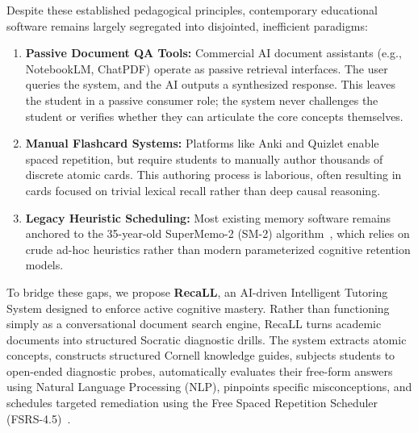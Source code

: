 \documentclass[conference]{IEEEtran}
\begin{document}
Despite these established pedagogical principles, contemporary educational software remains largely segregated into disjointed, inefficient paradigms:
\begin{enumerate}
    \item \textbf{Passive Document QA Tools:} Commercial AI document assistants (e.g., NotebookLM, ChatPDF) operate as passive retrieval interfaces. The user queries the system, and the AI outputs a synthesized response. This leaves the student in a passive consumer role; the system never challenges the student or verifies whether they can articulate the core concepts themselves.
    \item \textbf{Manual Flashcard Systems:} Platforms like Anki and Quizlet enable spaced repetition, but require students to manually author thousands of discrete atomic cards. This authoring process is laborious, often resulting in cards focused on trivial lexical recall rather than deep causal reasoning.
    \item \textbf{Legacy Heuristic Scheduling:} Most existing memory software remains anchored to the 35-year-old SuperMemo-2 (SM-2) algorithm~\cite{wozniak1990supermemo}, which relies on crude ad-hoc heuristics rather than modern parameterized cognitive retention models.
\end{enumerate}

To bridge these gaps, we propose \textbf{RecaLL}, an AI-driven Intelligent Tutoring System designed to enforce active cognitive mastery. Rather than functioning simply as a conversational document search engine, RecaLL turns academic documents into structured Socratic diagnostic drills. The system extracts atomic concepts, constructs structured Cornell knowledge guides, subjects students to open-ended diagnostic probes, automatically evaluates their free-form answers using Natural Language Processing (NLP), pinpoints specific misconceptions, and schedules targeted remediation using the Free Spaced Repetition Scheduler (FSRS-4.5)~\cite{ye2022fsrs}.
\end{document}
